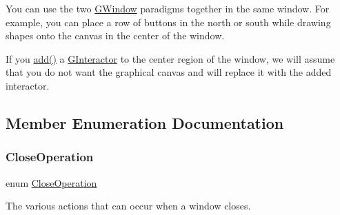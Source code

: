 You can use the two \mbox{\hyperlink{classsgl_1_1GWindow}{G\+Window}} paradigms together in the same window. For example, you can place a row of buttons in the north or south while drawing shapes onto the canvas in the center of the window.

If you \mbox{\hyperlink{classsgl_1_1GWindow_a6f99b7c841256dbdc5acaafbbca4e685}{add()}} a \mbox{\hyperlink{classsgl_1_1GInteractor}{G\+Interactor}} to the center region of the window, we will assume that you do not want the graphical canvas and will replace it with the added interactor. 

\subsection{Member Enumeration Documentation}
\mbox{\label{classsgl_1_1GWindow_a84803201f0f9569db61f51cac9e0d2d2}} 
\subsubsection{\texorpdfstring{Close\+Operation}{CloseOperation}}
{\footnotesize\ttfamily enum \mbox{\hyperlink{classsgl_1_1GWindow_a84803201f0f9569db61f51cac9e0d2d2}{Close\+Operation}}}



The various actions that can occur when a window closes. 

